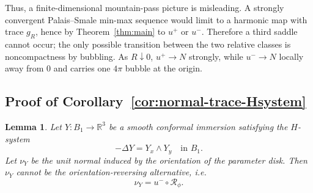 \documentclass[11pt]{amsart}
\numberwithin{equation}{section}
\newtheorem{lemma}[theorem]{Lemma}
\theoremstyle{remark}
\begin{document}
Thus, a finite-dimensional mountain-pass picture is misleading. A strongly convergent Palais--Smale min-max sequence would limit to a harmonic
map with trace $g_R$, hence by Theorem~\ref{thm:main} to $u^+$ or $u^-$. Therefore a third saddle cannot occur; the only possible transition
between the two relative classes is noncompactness by bubbling.
As $R\downarrow0$, $u^+\to N$ strongly, while $u^-\to N$ locally away from $0$ and carries one $4\pi$ bubble at the origin.


\subsection{Proof of Corollary~\ref{cor:normal-trace-Hsystem}}

\begin{lemma}\label{reverseimpossible}
Let $Y:B_1\to\mathbb R^3$ be a smooth conformal immersion satisfying the
$H$-system
\[
 -\Delta Y=Y_x\wedge  Y_y \quad\text{in }B_1.
\]
Let $\nu_Y$
be the unit normal induced by the orientation of the parameter disk.  Then  $\nu_Y$ cannot be
 the orientation-reversing alternative, i.e.
\[
 \nu_Y=u^-\circ\mathcal R_\phi.
\]
\end{lemma}
\end{document}
